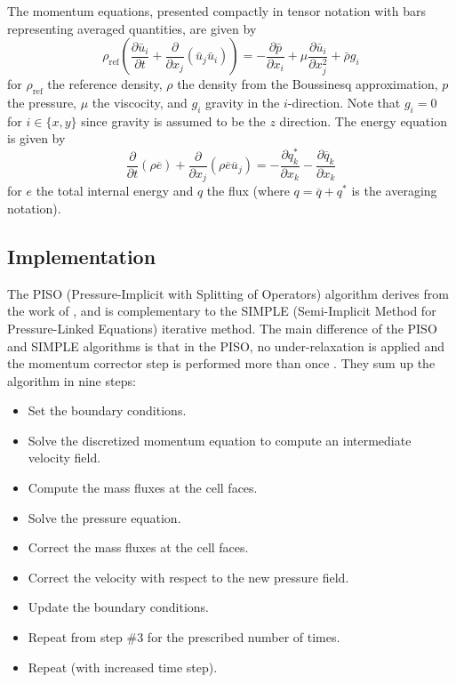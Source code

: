 The momentum equations, presented compactly in tensor notation with bars representing averaged quantities, are given by
\begin{equation} \rho_\text{ref} \left ( \frac{\partial \bar{u}_i}{\partial t} + \frac{\partial}{\partial x_j} \left( \bar{u}_j \bar{u}_i \right) \right )
= -\frac{\partial \bar{p}} {\partial{x_i}} +  \mu \frac{\partial \bar{u}_i}{\partial x_j^2} + \bar{\rho} g_i \end{equation}
for $\rho_\text{ref}$ the reference density, $\rho$ the density from the Boussinesq approximation, $p$ the pressure, $\mu$ the viscocity, and $g_i$ gravity in the $i$-direction.
Note that $g_i = 0$ for $i \in \{ x,y\}$ since gravity is assumed to be the $z$ direction.
The energy equation is given by
\begin{equation} \frac{\partial }{\partial t} \left ( \rho \overline{e}\right ) + \frac{\partial}{\partial x_j} \left ( \rho \overline{e} \overline{u}_j \right ) 
= 
- \frac{\partial q_k^*}{\partial x_k}
- \frac{\partial \overline{q}_k}{\partial x_k}
\end{equation}
for $e$ the total internal energy and $q$ the flux (where $q = \overline{q} + q^*$ is the averaging notation).

\subsection{Implementation}

The PISO (Pressure-Implicit with Splitting of Operators) algorithm derives from the work of \cite{issa1986solution}, and is complementary to the SIMPLE (Semi-Implicit Method for Pressure-Linked Equations) \cite{patankar1972calculation} iterative method.
The main difference of the PISO and SIMPLE algorithms is that in the PISO, no under-relaxation is applied and the momentum corrector step is performed more than once \cite{ferziger1996computational}.
They sum up the algorithm in nine steps:
\begin{itemize}
\item Set the boundary conditions.
\item Solve the discretized momentum equation to compute an intermediate velocity field.
\item Compute the mass fluxes at the cell faces.
\item Solve the pressure equation.
\item Correct the mass fluxes at the cell faces.
\item Correct the velocity with respect to the new pressure field.
\item Update the boundary conditions.
\item Repeat from step \#3 for the prescribed number of times.
\item Repeat (with increased time step).
\end{itemize}

